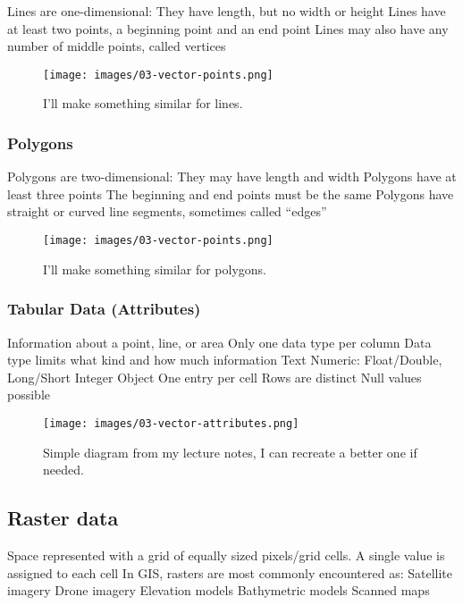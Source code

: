 \documentclass[
]{book}
\begin{document}
Lines are one-dimensional:
They have length, but no width or height
Lines have at least two points, a beginning point and an end point
Lines may also have any number of middle points, called vertices

\begin{figure}
\centering
\texttt{[image: images/03-vector-points.png]}
\caption{I'll make something similar for lines.}
\end{figure}

\hypertarget{polygons}{%
\subsubsection{Polygons}\label{polygons}}

Polygons are two-dimensional:
They may have length and width
Polygons have at least three points
The beginning and end points must be the same
Polygons have straight or curved line segments, sometimes called ``edges''

\begin{figure}
\centering
\texttt{[image: images/03-vector-points.png]}
\caption{I'll make something similar for polygons.}
\end{figure}

\hypertarget{tabular-data-attributes}{%
\subsubsection{Tabular Data (Attributes)}\label{tabular-data-attributes}}

Information about a point, line, or area
Only one data type per column
Data type limits what kind and how much information
Text
Numeric: Float/Double, Long/Short Integer
Object
One entry per cell
Rows are distinct
Null values possible

\begin{figure}
\centering
\texttt{[image: images/03-vector-attributes.png]}
\caption{Simple diagram from my lecture notes, I can recreate a better one if needed.}
\end{figure}

\hypertarget{raster-data}{%
\subsection{Raster data}\label{raster-data}}

Space represented with a grid of equally sized pixels/grid cells.
A single value is assigned to each cell
In GIS, rasters are most commonly encountered as:
Satellite imagery
Drone imagery
Elevation models
Bathymetric models
Scanned maps
\end{document}
